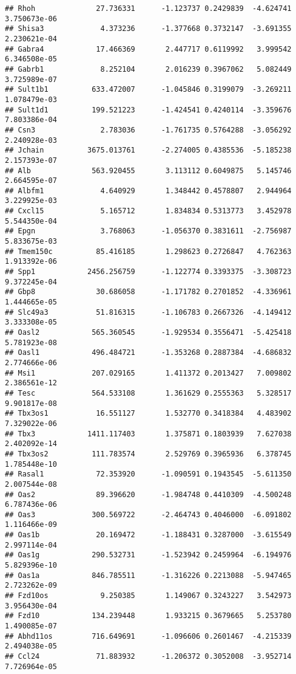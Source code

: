\documentclass[
]{article}
\begin{document}
\begin{verbatim}
## Rhoh              27.736331      -1.123737 0.2429839  -4.624741 3.750673e-06
## Shisa3             4.373236      -1.377668 0.3732147  -3.691355 2.230621e-04
## Gabra4            17.466369       2.447717 0.6119992   3.999542 6.346508e-05
## Gabrb1             8.252104       2.016239 0.3967062   5.082449 3.725989e-07
## Sult1b1          633.472007      -1.045846 0.3199079  -3.269211 1.078479e-03
## Sult1d1          199.521223      -1.424541 0.4240114  -3.359676 7.803386e-04
## Csn3               2.783036      -1.761735 0.5764288  -3.056292 2.240928e-03
## Jchain          3675.013761      -2.274005 0.4385536  -5.185238 2.157393e-07
## Alb              563.920455       3.113112 0.6049875   5.145746 2.664595e-07
## Albfm1             4.640929       1.348442 0.4578807   2.944964 3.229925e-03
## Cxcl15             5.165712       1.834834 0.5313773   3.452978 5.544350e-04
## Epgn               3.768063      -1.056370 0.3831611  -2.756987 5.833675e-03
## Tmem150c          85.416185       1.298623 0.2726847   4.762363 1.913392e-06
## Spp1            2456.256759      -1.122774 0.3393375  -3.308723 9.372245e-04
## Gbp8              30.686058      -1.171782 0.2701852  -4.336961 1.444665e-05
## Slc49a3           51.816315      -1.106783 0.2667326  -4.149412 3.333308e-05
## Oasl2            565.360545      -1.929534 0.3556471  -5.425418 5.781923e-08
## Oasl1            496.484721      -1.353268 0.2887384  -4.686832 2.774666e-06
## Msi1             207.029165       1.411372 0.2013427   7.009802 2.386561e-12
## Tesc             564.533108       1.361629 0.2555363   5.328517 9.901817e-08
## Tbx3os1           16.551127       1.532770 0.3418384   4.483902 7.329022e-06
## Tbx3            1411.117403       1.375871 0.1803939   7.627038 2.402092e-14
## Tbx3os2          111.783574       2.529769 0.3965936   6.378745 1.785448e-10
## Rasal1            72.353920      -1.090591 0.1943545  -5.611350 2.007544e-08
## Oas2              89.396620      -1.984748 0.4410309  -4.500248 6.787436e-06
## Oas3             300.569722      -2.464743 0.4046000  -6.091802 1.116466e-09
## Oas1b             20.169472      -1.188431 0.3287000  -3.615549 2.997114e-04
## Oas1g            290.532731      -1.523942 0.2459964  -6.194976 5.829396e-10
## Oas1a            846.785511      -1.316226 0.2213088  -5.947465 2.723262e-09
## Fzd10os            9.250385       1.149067 0.3243227   3.542973 3.956430e-04
## Fzd10            134.239448       1.933215 0.3679665   5.253780 1.490085e-07
## Abhd11os         716.649691      -1.096606 0.2601467  -4.215339 2.494038e-05
## Ccl24             71.883932      -1.206372 0.3052008  -3.952714 7.726964e-05

\end{verbatim}
\end{document}
